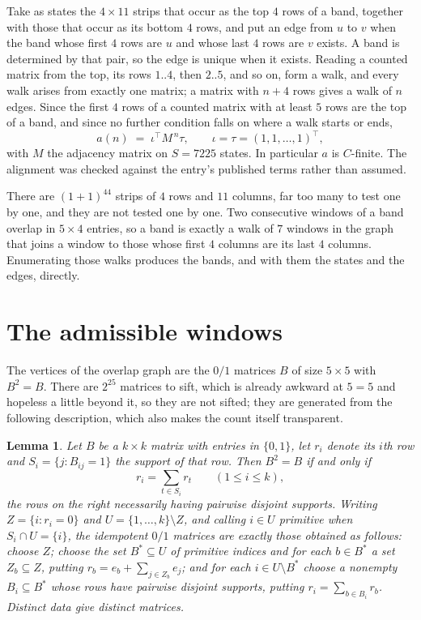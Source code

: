 \documentclass[11pt,a4paper]{article}
\theoremstyle{plain}
\newtheorem{lemma}[theorem]{Lemma}
\theoremstyle{definition}
\begin{document}
Take as states the $4\times11$ strips that occur as the top $4$ rows of a band,
together with those that occur as its bottom $4$ rows, and put an edge from $u$ to $v$
when the band whose first $4$ rows are $u$ and whose last $4$ rows are $v$ exists.
A band is determined by that pair, so the edge is unique when it exists. Reading a counted
matrix from the top, its rows $1..4$, then $2..5$, and so on, form a walk, and every
walk arises from exactly one matrix; a matrix with $n+4$ rows gives a walk of $n$ edges.
Since the first $4$ rows of a counted matrix with at least $5$ rows are the top of a
band, and since no further condition falls on where a walk starts or ends,
\[
a(n)\;=\;\iota^{\!\top}M^{\,n}\tau ,\qquad \iota=\tau=(1,1,\dots,1)^{\!\top},
\]
with $M$ the adjacency matrix on $S=7225$ states. In particular $a$ is $C$-finite. The
alignment was checked against the entry's published terms rather than assumed.

There are $(1 + 1)^{44}$ strips of $4$ rows and $11$ columns, far too
many to test one by one, and they are not tested one by one. Two consecutive windows of a band
overlap in $5\times4$ entries, so a band is exactly a walk of $7$ windows in
the graph that joins a window to those whose first $4$ columns are its last $4$
columns. Enumerating those walks produces the bands, and with them the states and the edges,
directly.

\section{The admissible windows}

The vertices of the overlap graph are the $0/1$ matrices $B$ of size $5\times5$ with
$B^2=B$. There are $2^{25}$ matrices to sift, which is already awkward at $5=5$ and
hopeless a little beyond it, so they are not sifted; they are generated from the following
description, which also makes the count itself transparent.

\begin{lemma}\label{lem:idem}
Let $B$ be a $k\times k$ matrix with entries in $\{0,1\}$, let $r_i$ denote its $i$th row and
$S_i=\{j:B_{ij}=1\}$ the support of that row. Then $B^2=B$ if and only if
\[
r_i=\sum_{t\in S_i}r_t \qquad (1\le i\le k),
\]
the rows on the right necessarily having pairwise disjoint supports. Writing
$Z=\{i:r_i=0\}$ and $U=\{1,\dots,k\}\setminus Z$, and calling $i\in U$ \emph{primitive}
when $S_i\cap U=\{i\}$, the idempotent $0/1$ matrices are exactly those obtained as follows:
choose $Z$; choose the set $B^{\ast}\subseteq U$ of primitive indices and for each
$b\in B^{\ast}$ a set $Z_b\subseteq Z$, putting $r_b=e_b+\sum_{j\in Z_b}e_j$; and for each
$i\in U\setminus B^{\ast}$ choose a nonempty $B_i\subseteq B^{\ast}$ whose rows have
pairwise disjoint supports, putting $r_i=\sum_{b\in B_i}r_b$. Distinct data give distinct
matrices.
\end{lemma}
\end{document}
